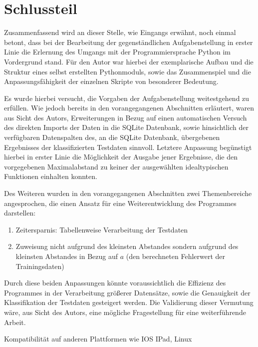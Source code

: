 \chapter{Schlussteil}

Zusammenfassend wird an dieser Stelle, wie Eingangs erwähnt, noch einmal betont, dass bei der Bearbeitung der gegenständlichen Aufgabenstellung in erster Linie die Erlernung des Umgangs mit der Programmiersprache Python im Vordergrund stand. Für den Autor war hierbei der exemplarische Aufbau und die Struktur eines selbst erstellten Pythonmoduls, sowie das Zusammenspiel und die Anpassungsfähigkeit der einzelnen Skripte von besonderer Bedeutung.

Es wurde hierbei versucht, die Vorgaben der Aufgabenstellung weitestgehend zu erfüllen. Wie jedoch bereits in den vorangegangenen Abschnitten erläutert, waren aus Sicht des Autors, Erweiterungen in Bezug auf einen automatischen Versuch des direkten Imports der Daten in die SQLite Datenbank, sowie hinsichtlich der verfügbaren Datenspalten des, an die SQLite Datenbank, übergebenen Ergebnisses der klassifizierten Testdaten sinnvoll. Letztere Anpassung begünstigt hierbei in erster Linie die Möglichkeit der Ausgabe jener Ergebnisse, die den vorgegebenen Maximalabstand zu keiner der ausgewählten idealtypischen Funktionen einhalten konnten.

Des Weiteren wurden in den vorangegangenen Abschnitten zwei Themenbereiche angesprochen, die einen Ansatz für eine Weiterentwicklung des Programmes darstellen:

\begin{enumerate}
 \itemsep0pt
 \item Zeitersparnis: Tabellenweise Verarbeitung der Testdaten
 \item Zuweisung nicht aufgrund des kleinsten Abstandes sondern aufgrund des kleinsten Abstandes in Bezug auf $a$ (den berechneten Fehlerwert der Trainingsdaten)
\end{enumerate}

Durch diese beiden Anpassungen könnte voraussichtlich die Effizienz des Programmes in der Verarbeitung größerer Datensätze, sowie die Genauigkeit der Klassifikation der Testdaten gesteigert werden. Die Validierung dieser Vermutung wäre, aus Sicht des Autors, eine mögliche Fragestellung für eine weiterführende Arbeit. 

Kompatibilität \cite{dunn_getting_2017-1}auf anderen Plattformen wie IOS IPad, Linux  \citep[][S. 22]{lampe_clean_2020} 


